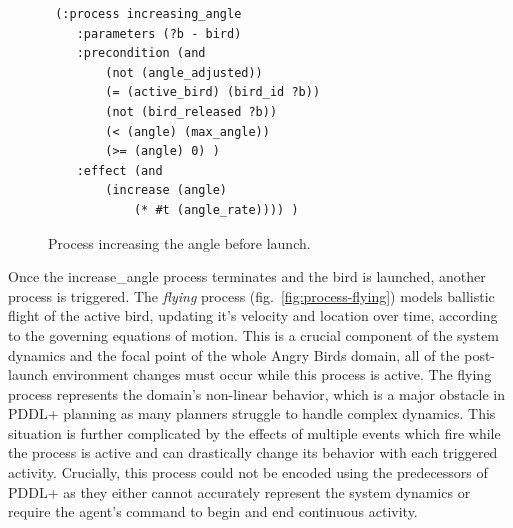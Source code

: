 \begin{figure}
\begin{center}
    \fontsize{8pt}{10pt}\selectfont
\begin{verbatim}
 (:process increasing_angle
    :parameters (?b - bird)
    :precondition (and
        (not (angle_adjusted))
        (= (active_bird) (bird_id ?b))
        (not (bird_released ?b))
        (< (angle) (max_angle))
        (>= (angle) 0) )
    :effect (and
        (increase (angle) 
            (* #t (angle_rate)))) )
\end{verbatim}
\caption{Process increasing the angle before launch.}
\label{fig:process-launch}
\end{center}
\end{figure}


Once the increase\_angle process terminates and the bird is launched, another process is triggered. The \textit{flying} process (fig.~\ref{fig:process-flying}) models ballistic flight of the active bird, updating it's velocity and location over time, according to the governing equations of motion. This is a crucial component of the system dynamics and the focal point of the whole Angry Birds domain, all of the post-launch environment changes must occur while this process is active. The flying process represents the domain's non-linear behavior, which is a major obstacle in PDDL+ planning as many planners struggle to handle complex dynamics. This situation is further complicated by the effects of multiple events which fire while the process is active and can drastically change its behavior with each triggered activity. Crucially, this process could not be encoded using the predecessors of PDDL+ as they either cannot accurately represent the system dynamics or require the agent's command to begin and end continuous activity. 

